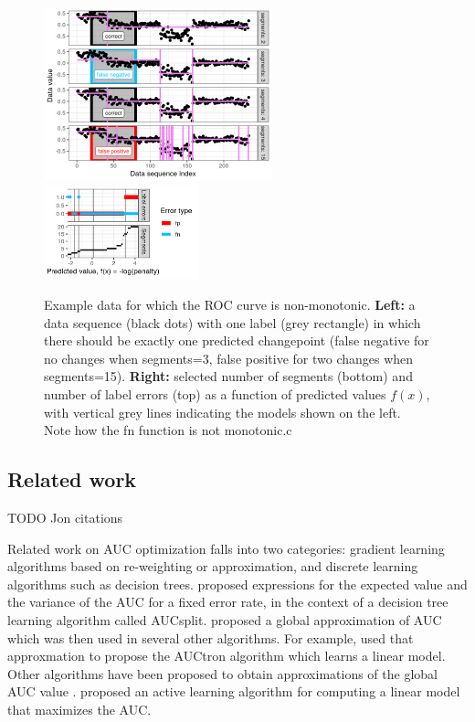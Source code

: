\documentclass{article}
\begin{document}
\begin{figure}[ht]
\vskip 0.2in
\begin{center}
\includegraphics[width=0.59\textwidth]{figure-fn-not-monotonic.png}
\includegraphics[width=0.4\textwidth]{figure-fn-not-monotonic-error.png}
\vskip -0.5cm
\caption{Example data for which the ROC curve is non-monotonic. 
\textbf{Left:} a data sequence (black dots) with one label (grey rectangle) in which there should be exactly one predicted changepoint (false negative for no changes when segments=3, false positive for two changes when segments=15).  
\textbf{Right:} selected number of segments (bottom) and number of label errors (top) as a function of predicted values $f(x)$, with vertical grey lines indicating the models shown on the left. Note how the fn function is not monotonic.c
}
\label{fig:fn-not-monotonic}
\end{center}
\vskip -0.2in
\end{figure}


\subsection{Related work}
\label{sec:related-work}

TODO Jon citations

Related work on AUC optimization falls into two categories: gradient
learning algorithms based on re-weighting or approximation, and
discrete learning algorithms such as decision trees.
\citet{ferri2002learning} proposed expressions for the expected value
and the variance of the AUC for a fixed error rate, in the context of
a decision tree learning algorithm called AUCsplit.
\citet{yan2003optimizing} proposed a global approximation of AUC which was then used in several other algorithms.
For example, \citet{castro2008optimization} used that approxmation to propose the AUCtron algorithm which learns a linear model.
Other algorithms have been proposed to obtain approximations of the global AUC value \citep{yan2003optimizing, rakotomamonjy2004optimizing, herschtal2004optimising, herschtal2006area}.
\citet{Han2010} proposed an active learning algorithm for computing a linear model that maximizes the AUC.
\end{document}
